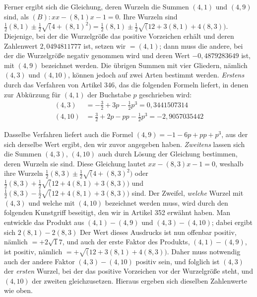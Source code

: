 Ferner ergibt sich die Gleichung, deren Wurzeln die Summen \((4,1)\) und \((4,9)\) sind, als \((B):xx-(8,1)x-1=0\). Ihre Wurzeln sind \(\frac12(8,1)\pm\frac12\surd(4+(8,1)^2)=\frac12(8,1)\pm\frac12\surd(12+3(8,1)+4(8,3))\). Diejenige, bei der die Wurzelgröße das positive Vorzeichen erhält und deren Zahlenwert \(2{,}0494811777\) ist, setzen wir \(=(4,1)\); dann muss die andere, bei der die Wurzelgröße negativ genommen wird und deren Wert \(-0{,}4879283649\) ist, mit \((4,9)\) bezeichnet werden. Die übrigen Summen mit vier Gliedern, nämlich \((4,3)\) und \((4,10)\), können jedoch auf zwei Arten bestimmt werden. \textit{Erstens} durch das Verfahren von Artikel 346, das die folgenden Formeln liefert, in denen zur Abkürzung für \((4,1)\) der Buchstabe \(p\) geschrieben wird: \[\begin{aligned}(4,3)&=-\frac32+3p-\frac12p^3=0{,}3441507314\\(4,10)&=\frac32+2p-pp-\frac12p^3=-2{,}9057035442\end{aligned}\]

Dasselbe Verfahren liefert auch die Formel \((4,9)=-1-6p+pp+p^3\), aus der sich derselbe Wert ergibt, den wir zuvor angegeben haben. \textit{Zweitens} lassen sich die Summen \((4,3)\), \((4,10)\) auch durch Lösung der Gleichung bestimmen, deren Wurzeln sie sind. Diese Gleichung lautet \(xx-(8,3)x-1=0\), weshalb ihre Wurzeln \(\frac12(8,3)\pm\frac12\surd(4+(8,3)^2)\) oder \(\frac12(8,3)+\frac12\surd(12+4(8,1)+3(8,3))\) und \(\frac12(8,3)-\frac12\surd(12+4(8,1)+3(8,3))\) sind. Der Zweifel, \textit{welche} Wurzel mit \((4,3)\) und welche mit \((4,10)\) bezeichnet werden muss, wird durch den folgenden Kunstgriff beseitigt, den wir in Artikel 352 erwähnt haben. Man entwickle das Produkt aus \((4,1)-(4,9)\) und \((4,3)-(4,10)\); dabei ergibt sich \(2(8,1)-2(8,3)\) Der Wert dieses Ausdrucks ist nun offenbar positiv, nämlich \(=+2\surd 17\), und auch der erste Faktor des Produkts, \((4,1)-(4,9)\), ist positiv, nämlich \(=+\surd(12+3(8,1)+4(8,3))\). Daher muss notwendig auch der andere Faktor \((4,3)-(4,10)\) positiv sein, und folglich ist \((4,3)\) der \textit{ersten} Wurzel, bei der das positive Vorzeichen vor der Wurzelgröße steht, und \((4,10)\) der zweiten gleichzusetzen. Hieraus ergeben sich dieselben Zahlenwerte wie oben.

